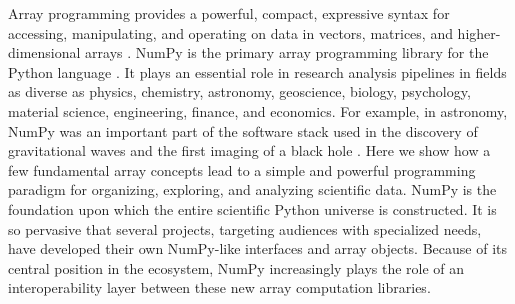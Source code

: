 




Array programming provides a powerful, compact, expressive syntax for accessing,
manipulating, and operating on data in vectors, matrices, and
higher-dimensional arrays \cite{iverson1980notation}.
NumPy is the primary array programming library for the Python language
\cite{dubois2007guest,oliphant2007python,millman2011python,perez2011python}.
It plays an essential role in research analysis pipelines in fields as
diverse as physics, chemistry, astronomy, geoscience, biology, psychology,
material science, engineering, finance, and economics.
For example, in astronomy, NumPy was an important part of the software stack used
in the discovery of gravitational waves \cite{abbott2016observation}
and the first imaging of a black hole \cite{eht-imaging}.
Here we show how a few fundamental array concepts lead to a simple and
powerful programming paradigm for organizing, exploring, and analyzing
scientific data.
NumPy is the foundation upon which the entire scientific Python
universe is constructed. It is so pervasive that several projects,
targeting audiences with specialized needs, have developed their own
NumPy-like interfaces and array objects. Because of its central position in the
ecosystem, NumPy increasingly plays the role of an interoperability layer
between these new array computation libraries.
